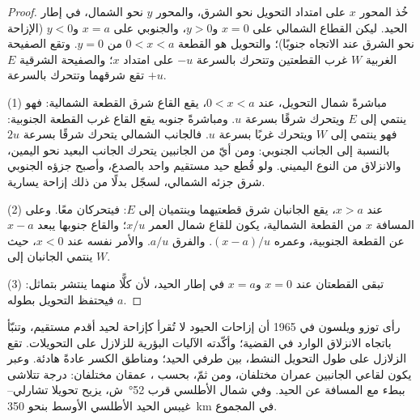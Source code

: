 \begin{proof}
خُذ المحور $x$ على امتداد التحويل نحو الشرق، والمحور $y$ نحو الشمال، في إطار الحيد. ليكن القطاع الشمالي على $x = 0$ و$y > 0$، والجنوبي على $x = a$ و$y < 0$ (الإزاحة نحو الشرق عند الاتجاه جنوبًا)؛ والتحويل هو القطعة $0 < x < a$ من $y = 0$. وتقع الصفيحة الغربية $W$ غرب القطعتين وتتحرك بالسرعة $-u$ على امتداد $x$؛ والصفيحة الشرقية $E$ تقع شرقهما وتتحرك بالسرعة $+u$.

(1) مباشرةً شمال التحويل، عند $0 < x < a$، يقع القاع شرق القطعة الشمالية: فهو ينتمي إلى $E$ ويتحرك شرقًا بسرعة $u$. ومباشرةً جنوبه يقع القاع غرب القطعة الجنوبية: فهو ينتمي إلى $W$ ويتحرك غربًا بسرعة $u$. فالجانب الشمالي يتحرك شرقًا بسرعة $2u$ بالنسبة إلى الجانب الجنوبي: ومن أيّ من الجانبين يتحرك الجانب البعيد نحو اليمين، والانزلاق من النوع اليميني. ولو قُطع حيد مستقيم واحد بالصدع، وأصبح جزؤه الجنوبي شرق جزئه الشمالي، لسجّل بدلًا من ذلك إزاحة يسارية.

(2) عند $x > a$، يقع الجانبان شرق قطعتيهما وينتميان إلى $E$: فيتحركان معًا. وعلى المسافة $x$ من القطعة الشمالية، يكون للقاع شمال  العمر $x/u$؛ والقاع جنوبها يبعد $x - a$ عن القطعة الجنوبية، وعمره $(x - a)/u$. والفرق $a/u$. والأمر نفسه عند $x < 0$، حيث ينتمي الجانبان إلى $W$.

(3) تبقى القطعتان عند $x = 0$ و$x = a$ في إطار الحيد، لأن كلًّا منهما ينتشر بتماثل: فيحتفظ التحويل بطوله $a$.
\end{proof}

رأى توزو ويلسون في 1965 أن إزاحات الحيود لا تُقرأ كإزاحة لحيد أقدم مستقيم، وتنبّأ باتجاه الانزلاق الوارد في القضية؛ وأكّدته الآليات البؤرية للزلازل على التحويلات. تقع الزلازل على طول التحويل النشط، بين طرفي الحيد؛ ومناطق الكسر عادةً هادئة. وعبر  يكون لقاعي الجانبين عمران مختلفان، ومن ثمّ، بحسب ، عمقان مختلفان: درجة تتلاشى ببطء مع المسافة عن الحيد. وفي شمال الأطلسي قرب \ang{52}~ش، يزيح تحويلا تشارلي–غيبس الحيد الأطلسي الأوسط بنحو \qty{350}{km} في المجموع.

